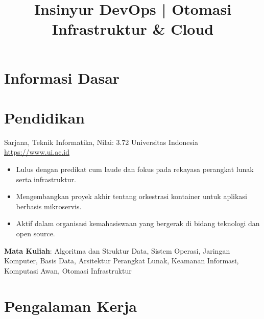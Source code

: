 \documentclass[a4paper, serif, 10pt]{moderncv}
\title{Insinyur DevOps | Otomasi Infrastruktur \& Cloud}
\begin{document}
\maketitle

\section{Informasi Dasar}

\section{Pendidikan}

        {Sarjana, Teknik Informatika, Nilai: 3.72}
        {Universitas Indonesia}
        {\url{https://www.ui.ac.id}}
        {}
        {\begin{itemize}
\item Lulus dengan predikat cum laude dan fokus pada rekayasa perangkat lunak serta infrastruktur.
\item Mengembangkan proyek akhir tentang orkestrasi kontainer untuk aplikasi berbasis mikroservis.
\item Aktif dalam organisasi kemahasiswaan yang bergerak di bidang teknologi dan open source.
\end{itemize}
\textbf{Mata Kuliah}: Algoritma dan Struktur Data, Sistem Operasi, Jaringan Komputer, Basis Data, Arsitektur Perangkat Lunak, Keamanan Informasi, Komputasi Awan, Otomasi Infrastruktur}
\section{Pengalaman Kerja}
\end{document}
